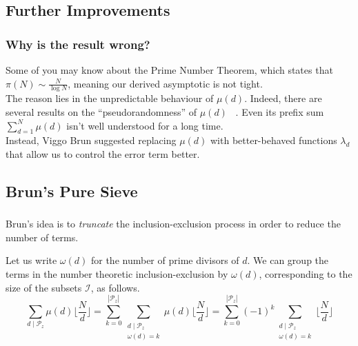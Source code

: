 
\subsection{Further Improvements}
\begin{frame}\frametitle{Why is the result wrong?}
Some of you may know about the Prime Number Theorem, which states that \(\pi(N) \sim \frac{N}{\log N}\), meaning our derived asymptotic is not tight.
\pause \\[5px]

The reason lies in the unpredictable behaviour of \(\mu(d)\). Indeed, there are several results on the ``pseudorandomness'' of \(\mu(d)\) ~\cite{GreenTao12}. Even its prefix sum \(\sum_{d = 1}^N \mu(d)\) isn't well understood for a long time.
\pause \\[5px]

Instead, Viggo Brun suggested replacing \(\mu(d)\) with better-behaved functions \(\lambda_d\) that allow us to control the error term better.
\end{frame}

\subsection{Brun's Pure Sieve}
\begin{frame}\frametitle{\insertsubsection}
Brun's idea is to \textit{truncate} the inclusion-exclusion process in order to reduce the number of terms.

Let us write \(\omega(d)\) for the number of prime divisors of \(d\). We can group the terms in the number theoretic inclusion-exclusion by \(\omega(d)\), corresponding to the size of the subsets \(\mathcal{I}\), as follows.
\[
  \sum_{d \mid \mathscr{P}_z} \mu(d)\lfloor\frac{N}{d}\rfloor
  = \sum_{k = 0}^{|\mathscr{P}_z|} \sum_{\substack{d \mid \mathscr{P}_z \\ \omega(d) = k}} \mu(d)\lfloor\frac{N}{d}\rfloor
  = \sum_{k = 0}^{|\mathscr{P}_z|} (-1)^k \sum_{\substack{d \mid \mathscr{P}_z \\ \omega(d) = k}} \lfloor\frac{N}{d}\rfloor
\]
\end{frame}

